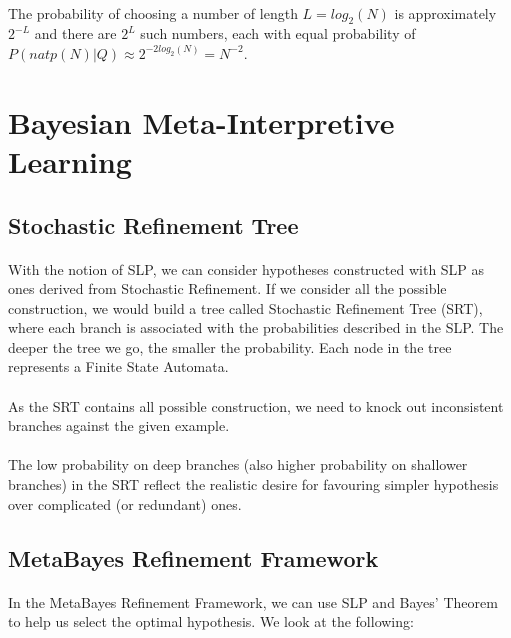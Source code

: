 \documentclass{article}
\theoremstyle{plain}
\theoremstyle{definition}
\begin{document}
\begin{multicols}{2}
\paragraph{} The probability of choosing a number of length $L = log_2(N)$ is approximately $2^{-L}$ and there are $2^L$ such numbers, each with equal probability of $P(natp(N)|Q) \approx 2^{-2log_2(N)} = N^{-2}$.

\section{Bayesian Meta-Interpretive Learning}

\subsection{Stochastic Refinement Tree}

\paragraph{} With the notion of SLP, we can consider hypotheses constructed with SLP as ones derived from Stochastic Refinement\cite{muggleton11}. If we consider all the possible construction, we would build a tree called Stochastic Refinement Tree (SRT),  where each branch is associated with the probabilities described in the SLP. The deeper the tree we go, the smaller the probability. Each node in the tree represents a Finite State Automata.

\paragraph{} As the SRT contains all possible construction, we need to knock out inconsistent branches against the given example.

\paragraph{} The low probability on deep branches (also higher probability on shallower branches) in the SRT reflect the realistic desire for favouring simpler hypothesis over complicated (or redundant) ones.

\subsection{MetaBayes Refinement Framework}

\paragraph{} In the MetaBayes Refinement Framework\cite{muggleton14}, we can use SLP and Bayes' Theorem to help us select the  optimal hypothesis. We look at the following:


\end{multicols}
\end{document}
